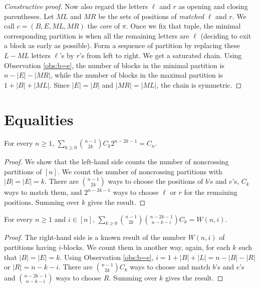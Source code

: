 \begin{proof}[Constructive proof]
  Now also regard the letters $\ell$ and $r$ as opening and closing parentheses. Let $\mathit{ML}$ and $\mathit{MR}$ be the sets of positions of \textit{matched} $\ell$ and $r$. We call $c=(B, E, \mathit{ML},\mathit{MR})$ the \textit{core} of $\pi$. Once we fix that tuple, the minimal corresponding partition is when all the remaining letters are $\ell$ (deciding to exit a block as early as possible). Form a sequence of partition by replacing these $L-\mathit{ML}$ letters $\ell$'s by $r$'s from left to right. We get a saturated chain. Using Observation  \ref{obs:b=e}, the number of blocks in the minimal partition is $n-|E|-|\mathit{MR}|$, while the number of blocks in the maximal partition is $1+|B|+|\mathit{ML}|$. Since $|E| = |B|$ and $|\mathit{MR}| = |\mathit{ML}|$, the chain is symmetric.
\end{proof}



\section{Equalities}
\begin{corollary}
  For every $n\ge 1$, $\sum\limits_{k\ge 0} \binom{n-1}{2k} C_k2^{n-2k-1} = C_n$.
\end{corollary}
\begin{proof}
  We show that the left-hand side counts the number of noncrossing partitions of $[n]$. We count the number of noncrossing partitions with $|B|=|E|=k$. There are $\binom{n-1}{2k}$ ways to choose the positions of $b$'s and $e$'s, $C_k$ ways to match them, and $2^{n-2k-1}$ ways to choose $\ell$ or $r$ for the remaining positions. Summing over $k$ gives the result.
\end{proof}

\begin{corollary}
  For every $n\ge 1$ and $i\in[n]$, $\sum\limits_{k\ge 0} \binom{n-1}{2k} \binom{n-2k-1}{n-k-i}C_k = W(n,i)$.
\end{corollary}

\begin{proof}
  The right-hand side is a known result of the number $W(n,i)$ of partitions having $i$-blocks. We count them in another way, again, for each $k$ such that $|B|=|E|=k$. Using Observation   \ref{obs:b=e}, $i = 1+|B| + |L| = n-|B|-|R|$ or $|R|=n-k-i$. There are $\binom{n-1}{2k}C_k$ ways to choose and match $b$'s and $e$'s and $\binom{n-2k-1}{n-k-i}$ ways to choose $R$. Summing over $k$ gives the result.
\end{proof}

